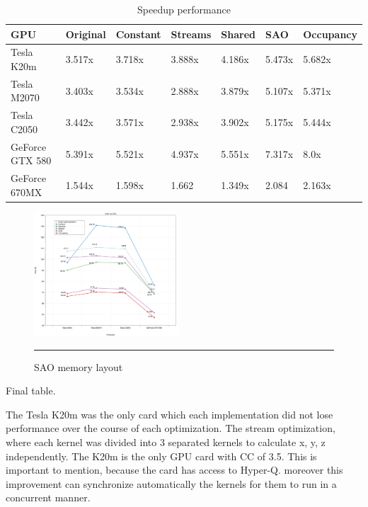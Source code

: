   \begin{table}[h]
\centering
  \begin{tabular} { |  l  |  l | l  |  l  | l | l | l |}
    \hline
    GPU & Original & Constant & Streams & Shared & SAO & Occupancy\\
    \hline
    Tesla K20m & 3.517x & 3.718x & 3.888x & 4.186x & 5.473x & 5.682x\\
   \hline
    Tesla M2070 & 3.403x & 3.534x & 2.888x & 3.879x & 5.107x & 5.371x\\
    \hline
    Tesla C2050 & 3.442x & 3.571x & 2.938x & 3.902x & 5.175x & 5.444x\\
   \hline
    GeForce GTX 580 & 5.391x & 5.521x & 4.937x & 5.551x & 7.317x & 8.0x\\
   \hline
    GeForce 670MX & 1.544x & 1.598x & 1.662 & 1.349x & 2.084 & 2.163x\\
   \hline
  \end{tabular}
    \caption{Speedup performance}
  \label{tab:speed}
  \end{table}

\begin{figure}[htbp]
	\centering
		\includegraphics[width=0.48\textwidth]{Figures/gpuOptimization.png}
		\rule{35em}{0.2pt}
	\caption[Structure of Arrays (SAO)]{SAO memory layout}
	\label{fig:sao}
\end{figure}

Final table.




    
The Tesla K20m was the only card which each implementation did not lose performance over the course of each optimization. The stream optimization, where each kernel was divided into 3 separated kernels to calculate x, y, z independently. The K20m is the only GPU card with CC of 3.5. This is important to mention, because the card has access to Hyper-Q. moreover this improvement can synchronize automatically the kernels for them to run in a concurrent manner. 

